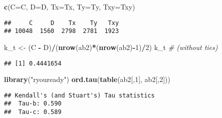 \documentclass[
]{article}
\newenvironment{Shaded}{\begin{snugshade}}{\end{snugshade}}
\newcommand{\CommentTok}[1]{\textcolor[rgb]{0.56,0.35,0.01}{\textit{#1}}}
\newcommand{\DataTypeTok}[1]{\textcolor[rgb]{0.13,0.29,0.53}{#1}}
\newcommand{\DecValTok}[1]{\textcolor[rgb]{0.00,0.00,0.81}{#1}}
\newcommand{\KeywordTok}[1]{\textcolor[rgb]{0.13,0.29,0.53}{\textbf{#1}}}
\newcommand{\NormalTok}[1]{#1}
\newcommand{\OperatorTok}[1]{\textcolor[rgb]{0.81,0.36,0.00}{\textbf{#1}}}
\newcommand{\StringTok}[1]{\textcolor[rgb]{0.31,0.60,0.02}{#1}}
\begin{document}
\begin{Shaded}
\begin{Highlighting}[]
\KeywordTok{c}\NormalTok{(}\DataTypeTok{C=}\NormalTok{C, }\DataTypeTok{D=}\NormalTok{D, }\DataTypeTok{Tx=}\NormalTok{Tx, }\DataTypeTok{Ty=}\NormalTok{Ty, }\DataTypeTok{Txy=}\NormalTok{Txy)}
\end{Highlighting}
\end{Shaded}

\begin{verbatim}
##     C     D    Tx    Ty   Txy 
## 10048  1560  2798  2781  1923
\end{verbatim}

\begin{Shaded}
\begin{Highlighting}[]
\NormalTok{k_t <-}\StringTok{ }\NormalTok{(C }\OperatorTok{-}\StringTok{ }\NormalTok{D)}\OperatorTok{/}\NormalTok{(}\KeywordTok{nrow}\NormalTok{(ab2)}\OperatorTok{*}\NormalTok{(}\KeywordTok{nrow}\NormalTok{(ab2)}\OperatorTok{-}\DecValTok{1}\NormalTok{)}\OperatorTok{/}\DecValTok{2}\NormalTok{)}
\NormalTok{k_t }\CommentTok{# (without ties)}
\end{Highlighting}
\end{Shaded}

\begin{verbatim}
## [1] 0.4441654
\end{verbatim}

\begin{Shaded}
\begin{Highlighting}[]
\KeywordTok{library}\NormalTok{(}\StringTok{"ryouready"}\NormalTok{)}
\KeywordTok{ord.tau}\NormalTok{(}\KeywordTok{table}\NormalTok{(ab2[,}\DecValTok{1}\NormalTok{], ab2[,}\DecValTok{2}\NormalTok{]))}
\end{Highlighting}
\end{Shaded}

\begin{verbatim}
## Kendall's (and Stuart's) Tau statistics
##  Tau-b: 0.590
##  Tau-c: 0.589
\end{verbatim}

\begin{Shaded}
\end{Shaded}
\end{document}
